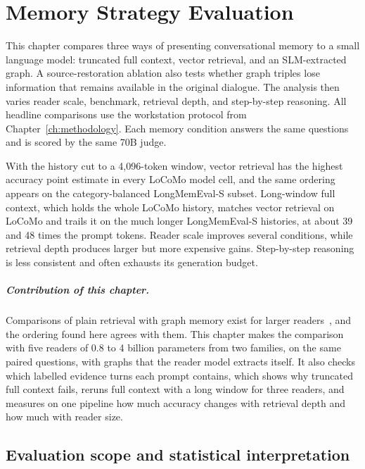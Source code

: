 
\chapter{Memory Strategy Evaluation}
\label{ch:memory_evaluation}

This chapter compares three ways of presenting conversational memory to a small language model:
truncated full context, vector retrieval, and an SLM-extracted graph. A source-restoration ablation
also tests whether graph triples lose information that remains available in the original dialogue.
The analysis then varies reader scale, benchmark, retrieval depth, and step-by-step reasoning. All
headline comparisons use the workstation protocol from Chapter~\ref{ch:methodology}. Each memory
condition answers the same questions and is scored by the same 70B judge.

With the history cut to a 4,096-token window, vector retrieval has the highest accuracy point
estimate in every LoCoMo model cell, and the same ordering appears on the category-balanced
LongMemEval-S subset. Long-window full context, which holds the whole LoCoMo history, matches
vector retrieval on LoCoMo and trails it on the much longer LongMemEval-S histories, at about 39 and
48 times the prompt tokens. Reader scale improves several
conditions, while retrieval depth produces larger but more expensive gains. Step-by-step reasoning
is less consistent and often exhausts its generation budget.

\paragraph{Contribution of this chapter.} Comparisons of plain retrieval with graph memory exist for
larger readers~\citep{rag_vs_graphrag,ai_hippocampus}, and the ordering found here agrees with them.
This chapter makes the comparison with five readers of 0.8 to 4 billion parameters from two
families, on the same paired questions, with graphs that the reader model extracts itself. It also
checks which labelled evidence turns each prompt contains, which shows why truncated full context
fails, reruns full context with a long window for three readers, and measures on one pipeline how much accuracy changes with retrieval depth and how much
with reader size.

\section{Evaluation scope and statistical interpretation}
\label{sec:ch4_scope}

